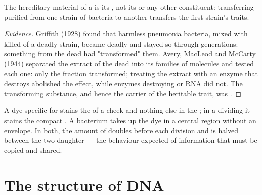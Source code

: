 \begin{proposition}\label{prop:g10:universal-dna:material}
The hereditary material of a  is its , not its  or any
other constituent: transferring purified  from one strain of
bacteria to another transfers the first strain's traits.
\end{proposition}
\begin{proof}[Evidence]
Griffith (1928) found that harmless pneumonia bacteria, mixed with
killed  of a deadly strain, became deadly and stayed so through
generations: something from the dead  had "transformed" them.
Avery, MacLeod and McCarty (1944) separated the extract of the dead
 into its families of molecules and tested each one: only the 
fraction transformed; treating the extract with an enzyme that
destroys  abolished the effect, while enzymes destroying  or
RNA did not. The transforming substance, and hence the carrier of the
heritable trait, was .
\end{proof}

\begin{example}\label{ex:g10:universal-dna:where}
A dye specific for  stains the  of a cheek  and nothing
else in the ; in a dividing  it stains the compact
. A bacterium takes up the dye in a central region without
an envelope. In both, the amount of  doubles before each division
and is halved between the two daughter  --- the behaviour
expected of information that must be copied and shared.
\end{example}

\section{The structure of DNA}

